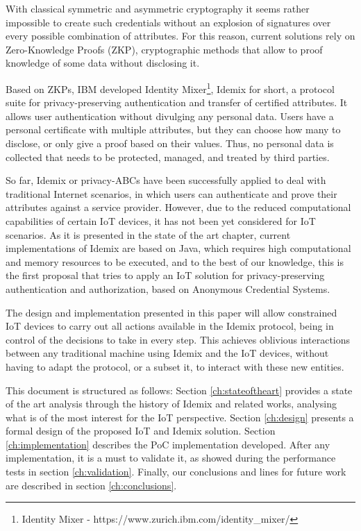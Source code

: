 With classical symmetric and asymmetric cryptography it seems rather impossible to create such credentials without an explosion of signatures over every possible combination of attributes. For this reason, current solutions rely on  Zero-Knowledge Proofs (ZKP), cryptographic methods that allow to proof knowledge of some data without disclosing it.

Based on ZKPs, IBM developed Identity Mixer\footnote{Identity Mixer - {https://www.zurich.ibm.com/identity\_mixer/}}, 
Idemix for short, a protocol suite for privacy-preserving authentication and transfer of certified attributes. It allows user authentication without divulging any personal data. Users have a personal certificate with multiple attributes, but they can choose how many to disclose, or only give a proof based on their values. Thus, no personal data is collected that needs to be protected, managed, and treated by third parties.

So far, Idemix or privacy-ABCs have been successfully applied to deal with traditional Internet scenarios, in which users can authenticate and prove their attributes against a service provider. However, due to the reduced computational capabilities of certain IoT devices, it has not been yet considered for IoT scenarios. As it is presented in the state of the art chapter, current implementations of Idemix are based on Java, which requires high computational and memory resources to be executed, and to the best of our knowledge, this is the first proposal that tries to apply an IoT solution for privacy-preserving authentication and authorization, based on Anonymous Credential Systems.

The design and implementation presented in this paper will allow constrained IoT devices to carry out all actions available in the Idemix protocol, being in control of the decisions to take in every step. This achieves oblivious interactions between any traditional machine using Idemix and the IoT devices, without having to adapt the protocol, or a subset it, to interact with these new entities.

\hfil

This document is structured as follows: Section \ref{ch:stateoftheart} provides a state of the art analysis through the history of Idemix and related works, analysing what is of the most interest for the IoT perspective. Section \ref{ch:design} presents a formal design of the proposed IoT and Idemix solution. Section \ref{ch:implementation} describes the PoC implementation developed. After any implementation, it is a must to validate it, as showed during the performance tests in section \ref{ch:validation}. Finally, our conclusions and lines for future work are described in section \ref{ch:conclusions}.
